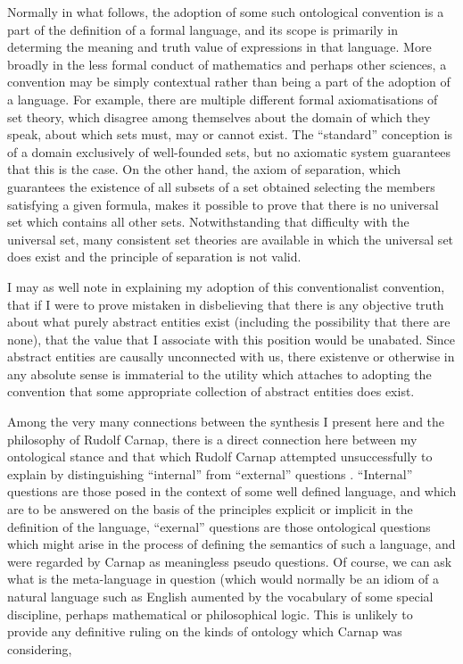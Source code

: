 \documentclass[10pt,titlepage]{book}
\begin{document}
Normally in what follows, the adoption of some such ontological convention is a part of the definition of a formal language, and its scope is primarily in determing the meaning and truth value of expressions in that language.
More broadly in the less formal conduct of mathematics and perhaps other sciences, a convention may be simply contextual rather than being a part of the adoption of a language.
For example, there are multiple different formal axiomatisations of set theory, which disagree among themselves about the domain of which they speak, about which sets must, may or cannot exist.
The ``standard'' conception is of a domain exclusively of well-founded sets, but no axiomatic system guarantees that this is the case.
On the other hand, the axiom of separation, which guarantees the existence of all subsets of a set obtained selecting the members satisfying a given formula, makes it possible to prove that there is no universal set which contains all other sets.
Notwithstanding that difficulty with the universal set, many consistent set theories are available in which the universal set does exist and the principle of separation is not valid.

I may as well note in explaining my adoption of this conventionalist convention, that if I were to prove mistaken in disbelieving that there is any objective truth about what purely abstract entities exist (including the possibility that there are none), that the value that I associate with this position would be unabated.
Since abstract entities are causally unconnected with us, there existenve or otherwise in any absolute sense is immaterial to the utility which attaches to adopting the convention that some appropriate collection of abstract entities does exist.

Among the very many connections between the synthesis I present here and the philosophy of Rudolf Carnap, there is a direct connection here between my ontological stance and that which Rudolf Carnap attempted unsuccessfully to explain by distinguishing ``internal'' from ``external'' questions \cite{carnap50}.
``Internal'' questions are those posed in the context of some well defined language, and which are to be answered on the basis of the principles explicit or implicit in the definition of the language, ``exernal'' questions are those ontological questions which might arise in the process of defining the semantics of such a language, and were regarded by Carnap as meaningless pseudo questions.
Of course, we can ask what is the meta-language in question (which would normally be an idiom of a natural language such as English aumented by the vocabulary of some special discipline, perhaps mathematical or philosophical logic.
This is unlikely to provide any definitive ruling on the kinds of ontology which Carnap was considering,
\end{document}
